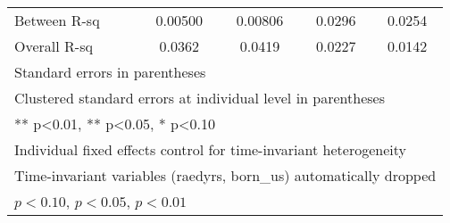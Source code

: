 \begin{table}[htbp]
\begin{tabular}{l*{4}{c}}
Between R-sq    &  0.00500         &  0.00806         &   0.0296         &   0.0254         \\
Overall R-sq    &   0.0362         &   0.0419         &   0.0227         &   0.0142         \\
\bottomrule
\multicolumn{5}{l}{\footnotesize Standard errors in parentheses}\\
\multicolumn{5}{l}{\footnotesize Clustered standard errors at individual level in parentheses}\\
\multicolumn{5}{l}{\footnotesize *** p<0.01, ** p<0.05, * p<0.10}\\
\multicolumn{5}{l}{\footnotesize Individual fixed effects control for time-invariant heterogeneity}\\
\multicolumn{5}{l}{\footnotesize Time-invariant variables (raedyrs, born\_us) automatically dropped}\\
\multicolumn{5}{l}{\footnotesize \sym{*} \(p<0.10\), \sym{**} \(p<0.05\), \sym{***} \(p<0.01\)}\\
\end{tabular}
\end{table}
